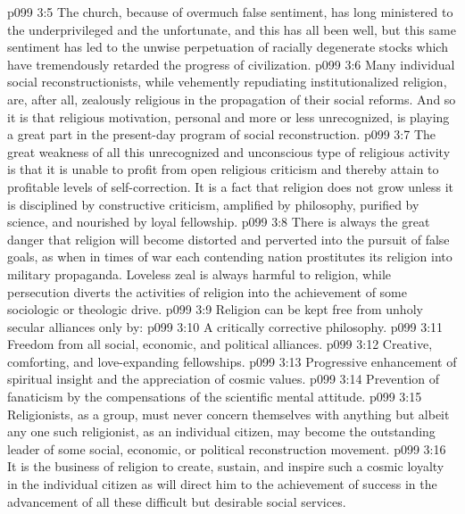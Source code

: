 \vs p099 3:5 The church, because of overmuch false sentiment, has long ministered to the underprivileged and the unfortunate, and this has all been well, but this same sentiment has led to the unwise perpetuation of racially degenerate stocks which have tremendously retarded the progress of civilization.
\vs p099 3:6 Many individual social reconstructionists, while vehemently repudiating institutionalized religion, are, after all, zealously religious in the propagation of their social reforms. And so it is that religious motivation, personal and more or less unrecognized, is playing a great part in the present\hyp{}day program of social reconstruction.
\vs p099 3:7 \pc The great weakness of all this unrecognized and unconscious type of religious activity is that it is unable to profit from open religious criticism and thereby attain to profitable levels of self\hyp{}correction. It is a fact that religion does not grow unless it is disciplined by constructive criticism, amplified by philosophy, purified by science, and nourished by loyal fellowship.
\vs p099 3:8 There is always the great danger that religion will become distorted and perverted into the pursuit of false goals, as when in times of war each contending nation prostitutes its religion into military propaganda. Loveless zeal is always harmful to religion, while persecution diverts the activities of religion into the achievement of some sociologic or theologic drive.
\vs p099 3:9 \pc Religion can be kept free from unholy secular alliances only by:
\vs p099 3:10 \bibnobreakspace A critically corrective philosophy.
\vs p099 3:11 \bibnobreakspace Freedom from all social, economic, and political alliances.
\vs p099 3:12 \bibnobreakspace Creative, comforting, and love\hyp{}expanding fellowships.
\vs p099 3:13 \bibnobreakspace Progressive enhancement of spiritual insight and the appreciation of cosmic values.
\vs p099 3:14 \bibnobreakspace Prevention of fanaticism by the compensations of the scientific mental attitude.
\vs p099 3:15 \pc Religionists, as a group, must never concern themselves with anything but  albeit any one such religionist, as an individual citizen, may become the outstanding leader of some social, economic, or political reconstruction movement.
\vs p099 3:16 It is the business of religion to create, sustain, and inspire such a cosmic loyalty in the individual citizen as will direct him to the achievement of success in the advancement of all these difficult but desirable social services.
